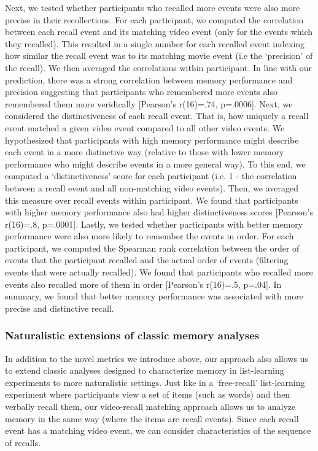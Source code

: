 \documentclass{article}
\begin{document}
{Next, we tested whether participants who recalled more events were also more precise in their recollections. For each participant, we computed the correlation between each recall event and its matching video event (only for the events which they recalled). This resulted in a single number for each recalled event indexing how similar the recall event was to its matching movie event (i.e the `precision' of the recall). We then averaged the correlations within participant. In line with our prediction, there was a strong correlation between memory performance and precision suggesting that participants who remembered more events also remembered them more veridically [Pearson's r(16)=.74, p=.0006]. Next, we considered the distinctiveness of each recall event. That is, how uniquely a recall event matched a given video event compared to all other video events. We hypothesized that participants with high memory performance might describe each event in a more distinctive way (relative to those with lower memory performance who might describe events in a more general way). To this end, we computed a `distinctiveness' score for each participant (i.e. 1 - the correlation between a recall event and all non-matching video events).  Then, we averaged this measure over recall events within participant.  We found that participants with higher memory performance also had higher distinctiveness scores [Pearson's r(16)=.8, p=.0001]. Lastly, we tested whether participants with better memory performance were also more likely to remember the events in order.  For each participant, we computed the Spearman rank correlation between the order of events that the participant recalled and the actual order of events (filtering events that were actually recalled).  We found that participants who recalled more events also recalled more of them in order [Pearson's r(16)=.5, p=.04]. In summary, we found that better memory performance was associated with more precise and distinctive recall.


\subsubsection{Naturalistic extensions of classic memory analyses}
In addition to the novel metrics we introduce above, our approach also allows us to extend classic analyses designed to characterize memory in list-learning experiments to more naturalistic settings. Just like in a `free-recall' list-learning experiment where participants view a set of items (such as words) and then verbally recall them, our video-recall matching approach allows us to analyze memory in the same way (where the items are recall events). Since each recall event has a matching video event, we can consider characteristics of the sequence of recalls.

}
\end{document}
